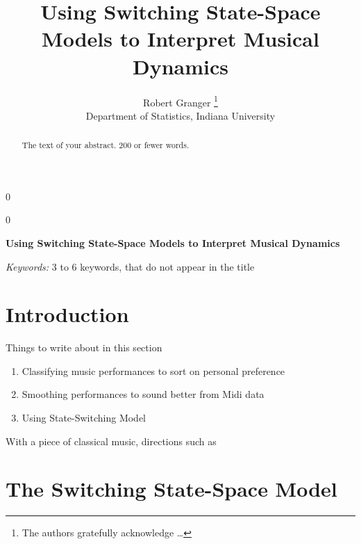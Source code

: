 \documentclass[12pt]{article}
\newcommand{\blind}{0}
\begin{document}
\def\spacingset#1{\renewcommand{\baselinestretch}%
{#1}\small\normalsize} \spacingset{1}



\blind
{
  \title{\bf Using Switching State-Space Models to Interpret Musical Dynamics}

  \author{
        Robert Granger \thanks{The authors gratefully acknowledge \ldots{}} \\
    Department of Statistics, Indiana University\\
      }
  \maketitle
} \fi

\blind
{
  \bigskip
  \bigskip
  \bigskip
  \begin{center}
    {\LARGE\bf Using Switching State-Space Models to Interpret Musical Dynamics}
  \end{center}
  \medskip
} \fi

\bigskip
\begin{abstract}
The text of your abstract. 200 or fewer words.
\end{abstract}

\noindent%
{\it Keywords:} 3 to 6 keywords, that do not appear in the title
\vfill

\newpage
\spacingset{1.45} %

\hypertarget{introduction}{%
\section{Introduction}\label{introduction}}

Things to write about in this section

\begin{enumerate}
\def\labelenumi{\arabic{enumi})}
\item
  Classifying music performances to sort on personal preference
\item
  Smoothing performances to sound better from Midi data
\item
  Using State-Switching Model
\end{enumerate}

With a piece of classical music, directions such as

\section{The Switching State-Space Model}
\label{sec:model}
\end{document}
